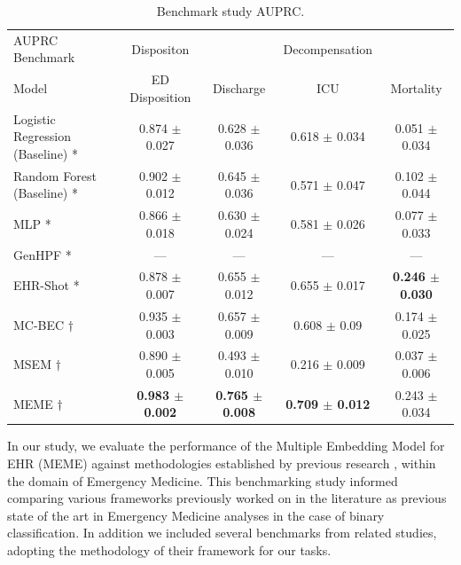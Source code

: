 \documentclass{article}
\theoremstyle{plain}
\theoremstyle{definition}
\theoremstyle{remark}
\begin{document}
\begin{table}[H]
\caption{Benchmark study AUPRC.}
\label{r3}
\begin{adjustbox}{width=\columnwidth}
\begin{small}
\begin{tabular}{l|c|ccc}
\toprule
AUPRC Benchmark & Dispositon & & Decompensation &\\
Model & ED Disposition & Discharge & ICU & Mortality \\
\midrule
Logistic Regression (Baseline) * &0.874 $\pm$ 0.027&0.628 $\pm$ 0.036& 0.618 $\pm$ 0.034& 0.051 $\pm$ 0.034\\
Random Forest (Baseline) *& 0.902 $\pm$ 0.012 & 0.645 $\pm$ 0.036 & 0.571 $\pm$ 0.047 &  0.102 $\pm$ 0.044  \\
MLP *& 0.866 $\pm$ 0.018 & 0.630 $\pm$ 0.024 & 0.581 $\pm$ 0.026 & 0.077 $\pm$ 0.033 \\
GenHPF * & --- & --- & ---& ---   \\
EHR-Shot *& 0.878 $\pm$ 0.007 & 0.655 $\pm $ 0.012 & 0.655 $\pm$ 0.017 & \textbf{0.246 $\pm$ 0.030} \\
MC-BEC $\dagger$& 0.935 $\pm$ 0.003& 0.657 $\pm$ 0.009 & 0.608 $\pm$ 0.09& 0.174 $\pm$ 0.025 \\
MSEM $\dagger$& 0.890 $\pm$ 0.005 & 0.493 $\pm$ 0.010 & 0.216 $\pm$ 0.009 & 0.037 $\pm$ 0.006\\
MEME $\dagger$& \textbf{0.983 $\pm$ 0.002} & \textbf{0.765 $\pm$ 0.008} & \textbf{0.709 $\pm$ 0.012} & 0.243 $\pm$ 0.034 \\
\bottomrule
\end{tabular}
\end{small}
\end{adjustbox}
\end{table}

In our study, we evaluate the performance of the Multiple Embedding Model for EHR (MEME) against methodologies established by previous research \citep{xie2022benchmarking}, within the domain of Emergency Medicine. This benchmarking study informed comparing various frameworks  previously worked on in the literature as previous state of the art in Emergency Medicine analyses in the case of binary classification. In addition we included several benchmarks from related studies, adopting the methodology of their framework for our tasks.

    
\end{document}
